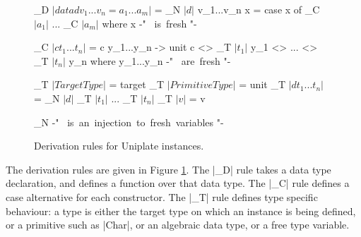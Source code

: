 \begin{figure}
\ignore\begin{code}
_D $| data d v_1...v_n = a_1...a_m |$ =
        _N $| d |$ \? v_1...v_n x = case  x of _C $| a_1 |$ \? ... \? _C $| a_m |$
    where x {-" \mbox{ is fresh} "-}

_C $| c t_1...t_n |$ =
        c y_1...y_n -> unit c <> _T $| t_1 |$ \? y_1 <> ... <> _T $| t_n |$ \? y_n
    where y_1...y_n {-" \mbox{ are fresh} "-}

_T $| TargetType     |$ = target
_T $| PrimitiveType  |$ = unit
_T $| d t_1...t_n    |$ = _N $| d |$ \? _T $| t_1 |$ \? ... \? _T $| t_n |$
_T $| v              |$ = v

_N {-" \mbox{ is an injection to fresh variables} "-}
\end{code}
\caption{Derivation rules for Uniplate instances.}
\label{fig:derive}
\end{figure}

The derivation rules are given in Figure \ref{fig:derive}. The |_D| rule takes a data type declaration, and defines a function over that data type. The |_C| rule defines a case alternative for each constructor. The |_T| rule defines type specific behaviour: a type is either the target type on which an instance is being defined, or a primitive such as |Char|, or an algebraic data type, or a free type variable.

\begin{comment}

To model the derivation of an instance, it is necessary to have a model of data types:

\begin{code}
data Data  = Data  Name [Var] [Ctor]
data Ctor  = Ctor  Name [Type]
data Type  = TyPrim | TyVar Var | TyApp Data [Type]

type Name  = String
type Var   = String
\end{code}

\begin{code}
isTarget :: a -> Bool
\end{code}

When writing a |Uniplate| instance for a particular data type, |isTarget| returns True for that data type. We define how to produce a function for a given |Data| type using the |_D| function:

\begin{code}


unwords $
    ['d':name] ++ vars ++ ["x ="] ++
    ["case x of {"] ++
        separate ";" (map _C ctors) ++
    ["}"]

_C (Ctor name typs) =
    [name] ++ vars ++ [" -> "] ++
    ["unit"] ++ [name] ++ ["<>"] ++
    separate "<>" (zipWith (:) vars (map _T typs))
    where vars = ['v':show i | i <- [1..length typs]]

_T (TyPrim                       ) = ["unit"]
_T (TyVar  v                     ) = [v]
_T (TyApp  d@(Data name _ _) ts  )
    | isTarget d  = ["target"]
    | otherwise   = ['d':name] ++ concatMap _T ts

separate sep xs = concat $ intersperse [sep] xs
\end{code}

\end{comment}

